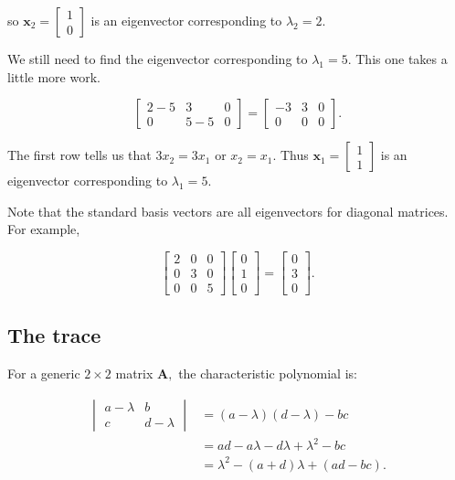 \documentclass[
]{book}
\theoremstyle{definition}
\theoremstyle{definition}
\theoremstyle{definition}
\theoremstyle{definition}
\theoremstyle{remark}
\begin{document}
so \(\mathbf{x}_2=\begin{bmatrix}1\\0\end{bmatrix}\) is an eigenvector corresponding to \(\lambda_2=2.\)

We still need to find the eigenvector corresponding to \(\lambda_1=5.\) This one takes a little more work.

\[\left[\begin{array}{cc|c} 2-5 & 3 & 0\\0 & 5-5 & 0\end{array}\right]=\left[\begin{array}{rr|r}-3 & 3& 0\\0 & 0 & 0\end{array}\right].\]

The first row tells us that \(3x_2=3x_1\) or \(x_2=x_1\). Thus \(\mathbf{x}_1=\begin{bmatrix}1\\1\end{bmatrix}\) is an eigenvector corresponding to \(\lambda_1=5.\)

Note that the standard basis vectors are all eigenvectors for diagonal matrices. For example,

\[\begin{bmatrix} 2 & 0 & 0\\ 0 & 3 & 0\\0 & 0 & 5\end{bmatrix}\begin{bmatrix}0\\1\\0\end{bmatrix}=\begin{bmatrix}0 \\3\\0\end{bmatrix}.\]

\subsection*{The trace}\label{the-trace}

For a generic \(2\times 2\) matrix \(\mathbf{A},\) the characteristic polynomial is:

\begin{align*} 
\begin{vmatrix} a-\lambda & b\\c & d-\lambda\end{vmatrix}&=(a-\lambda)(d-\lambda)-bc\\
&=ad-a\lambda-d\lambda+\lambda^2-bc\\
&=\lambda^2-(a+d)\lambda+(ad-bc).
\end{align*}
\end{document}
